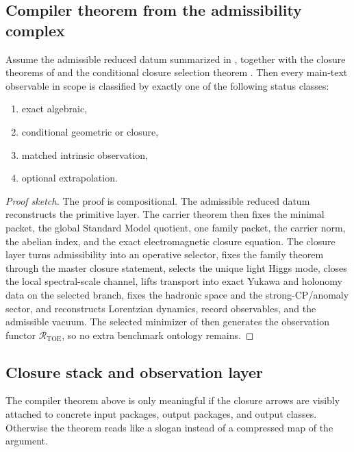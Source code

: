 \subsection{Compiler theorem from the admissibility complex}

\begin{theorem}
Assume the admissible reduced datum summarized in , together with the
closure theorems of  and the conditional closure selection theorem
. Then every main-text observable in scope is classified by
exactly one of the following status classes:
\begin{enumerate}[label=(\roman*), leftmargin=1.5em, topsep=3pt, itemsep=2pt]
    \item exact algebraic,
    \item conditional geometric or closure,
    \item matched intrinsic observation,
    \item optional extrapolation.
\end{enumerate}
\end{theorem}

\begin{proof}[Proof sketch]
The proof is compositional. The admissible reduced datum reconstructs the primitive layer. The
carrier theorem then fixes the minimal packet, the global Standard Model quotient, one family
packet, the carrier norm, the abelian index, and the exact electromagnetic closure equation. The
closure layer turns admissibility into an operative selector, fixes the family theorem through the
master closure statement, selects the unique light Higgs mode, closes the local spectral-scale
channel, lifts transport into exact Yukawa and holonomy data on the selected branch, fixes the
hadronic space and the strong-CP/anomaly sector, and reconstructs Lorentzian dynamics, record
observables, and the admissible vacuum. The selected minimizer of
 then generates the observation functor
$\mathcal R_{\mathrm{TOE}}$, so no extra benchmark ontology remains.
\end{proof}

\subsection{Closure stack and observation layer}

The compiler theorem above is only meaningful if the closure arrows are visibly attached to
concrete input packages, output packages, and output classes. Otherwise the theorem reads like a
slogan instead of a compressed map of the argument.

